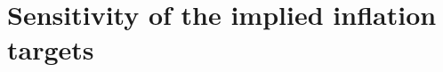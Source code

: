 \documentclass[11pt,a4paper]{article}
\theoremstyle{remark}\newtheorem{remark}{Remark}
\begin{document}
\section{Sensitivity of the implied inflation targets}\label{app:sens}
\begin{table}[h]\centering\small
\caption{Implied inflation targets under alternative inflation horizons and sample ends (gradualism model, realised inputs; ``deg.'' marks a degenerate fit with $|\hat\tau|>15$; ``--'' too few quarters).}\label{tab:sens}\end{table}
\end{document}
